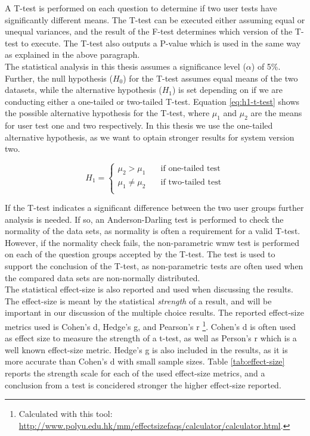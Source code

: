 A T-test \cite{walpole1993} is performed on each question to determine if two user tests have significantly different means. The T-test can be executed either assuming equal or unequal variances, and the result of the F-test determines which version of the T-test to execute. The T-test also outputs a P-value which is used in the same way as explained in the above paragraph. \\

The statistical analysis in this thesis assumes a significance level ($\alpha$) of 5\%. Further, the null hypothesis ($H_0$) for the T-test assumes equal means of the two datasets, while the alternative hypothesis ($H_1$) is set depending on if we are conducting either a one-tailed or two-tailed T-test. Equation \ref{eq:h1-t-test} shows the possible alternative hypothesis for the T-test, where $\mu_{1}$ and $\mu_{2}$ are the means for user test one and two respectively. In this thesis we use the one-tailed alternative hypothesis, as we want to optain stronger results for system version two.

\begin{equation} \label{eq:h1-t-test}
   H_1 =
    \begin{cases}
        \mu_{2} > \mu_{1} & \quad \text{if one-tailed test}\\
        \mu_{1} \neq \mu_{2} & \quad \text{if two-tailed test}\\
    \end{cases}
\end{equation}

If the T-test indicates a significant difference between the two user groups further analysis is needed. If so, an Anderson-Darling test \cite{razali2011} is performed to check the normality of the data sets, as normality is often a requirement for a valid T-test. However, if the normality check fails, the non-parametric \gls{wmw} test \cite{hodges2005} is performed on each of the question groups accepted by the T-test. The test is used to support the conclusion of the T-test, as non-parametric tests are often used when the compared data sets are non-normally distributed. \\

The statistical effect-size is also reported and used when discussing the results. The effect-size is meant by the statistical \textit{strength} of a result, and will be important in our discussion of the multiple choice results. The reported effect-size metrics used is Cohen's d, Hedge's g, and Pearson's r \cite{cumming2013}\footnote{Calculated with this tool: \url{http://www.polyu.edu.hk/mm/effectsizefaqs/calculator/calculator.html}.}. Cohen's d is often used as effect size to measure the strength of a t-test, as well as Person's r which is a well known effect-size metric. Hedge's g is also included in the results, as it is more accurate than Cohen's d with small sample sizes. Table \ref{tab:effect-size} reports the strength scale for each of the used effect-size metrics, and a conclusion from a test is concidered stronger the higher effect-size reported. \\

